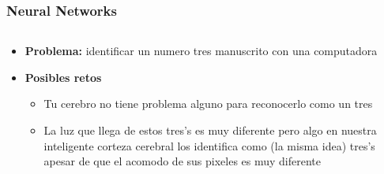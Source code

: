 \documentclass[10pt]{beamer}
\begin{document}
\begin{frame}
\frametitle{Neural Networks}

\begin{columns}
\begin{column}{.5\textwidth}
\begin{beamerboxesrounded}[upper=uppercolor, lower=lowercolor, shadow=true]{} 

\begin{itemize}
 \item \textbf{Problema:} identificar un numero tres manuscrito con una computadora
 \item \textbf{Posibles retos}
   \begin{itemize}
     \item Tu cerebro no tiene problema alguno para reconocerlo como un tres
     \item La luz que llega de estos tres's es muy diferente pero algo en nuestra inteligente corteza cerebral los identifica como (la misma idea) tres's apesar de que el acomodo de sus pixeles es muy diferente
     
   \end{itemize}
    
\end{itemize}
\end{beamerboxesrounded}


\end{column}%


\end{columns}
\end{frame}
\end{document}
